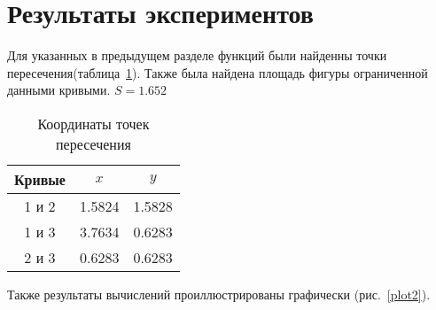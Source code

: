 \documentclass[a4paper,12pt,titlepage,finall]{article}
\begin{document}
\newpage

\section{Результаты экспериментов}

Для указанных в предыдущем разделе функций были найденны точки пересечения(таблица~\ref{table1}). Также была найдена площадь фигуры ограниченной данными кривыми. {$S=1.652$}

\begin{table}[h]
\centering
\begin{tabular}{|c|c|c|}
\hline
Кривые & $x$ & $y$ \\
\hline
1 и 2 &  1.5824 & 1.5828 \\
1 и 3 &  3.7634 & 0.6283 \\
2 и 3 &  0.6283 & 0.6283 \\
\hline
\end{tabular}
\caption{Координаты точек пересечения}
\label{table1}
\end{table}

Также результаты вычислений проиллюстрированы графически (рис.~\ref{plot2}).
\end{document}
